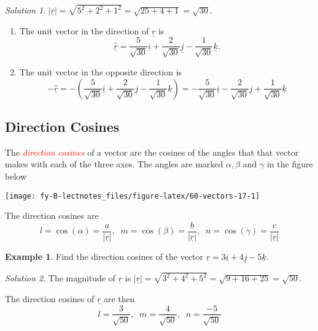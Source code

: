 \documentclass[
  11pt,
  oneside]{book}
\providecommand{\tightlist}{%
  \setlength{\itemsep}{0pt}\setlength{\parskip}{0pt}}
\newcommand{\slide}{}
\theoremstyle{definition}
\theoremstyle{definition}
\newtheorem{example}{Example}[chapter]
\theoremstyle{definition}
\theoremstyle{definition}
\theoremstyle{remark}
\newtheorem*{solution}{Solution}
\begin{document}
\begin{solution}

\(|\underline r| = \sqrt{5^2+2^2+1^2} = \sqrt{25+4+1} = \sqrt{30}\).

\begin{enumerate}
\def\labelenumi{\alph{enumi}.}
\tightlist
\item
  The unit vector in the direction of \(\underline r\) is
  \[
  \underline{\hat r} = \frac5{\sqrt{30}}\underline i+\frac2{\sqrt{30}}\underline j-\frac1{\sqrt{30}}\underline k.
  \]
\item
  The unit vector in the opposite direction is
  \[
  -\underline{\hat r} = -\left(\frac{5}{\sqrt{30}}\underline i+\frac{2}{\sqrt{30}}\underline j-\frac{1}{\sqrt{30}}\underline k\right) = -\frac{5}{\sqrt{30}}\underline i-\frac{2}{\sqrt{30}}\underline j+\frac{1}{\sqrt{30}}\underline k
  \]
\end{enumerate}

\end{solution}

\slide

\subsection{Direction Cosines}\label{direction-cosines}

The \textcolor{red}{\em direction cosines} of a vector are the cosines of the angles that that vector makes with each of
the three axes. The angles are marked \(\alpha, \beta\) and \(\gamma\) in the figure below

\begin{center}\texttt{[image: fy-B-lectnotes\_files/figure-latex/60-vectors-17-1]} \end{center}

The direction cosines are
\[
l = \cos(\alpha) = \frac{a}{|\underline r|},\;\;m = \cos(\beta) = \frac{b}{|\underline r|},\;\;n = \cos(\gamma) = \frac{c}{|\underline r|}
\]
\slide

\begin{example}
Find the direction cosines of the vector \(\underline r = 3\underline i + 4\underline j - 5\underline k\).
\end{example}

\begin{solution}
The magnitude of \(\underline r\) is \(|\underline r| = \sqrt{3^2+4^2+5^2} = \sqrt{9+16+25} = \sqrt{50}\).

The direction cosines of \(\underline r\) are then
\[
l = \frac{3}{\sqrt{50}},\;\;m = \frac{4}{\sqrt{50}},\;\;n = \frac{-5}{\sqrt{50}}
\]
\end{solution}
\end{document}

